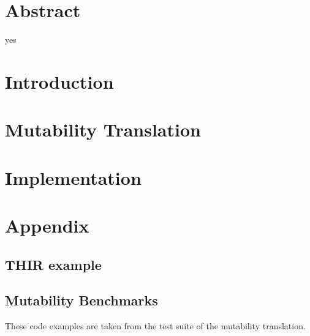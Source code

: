 \frontmatter
\chapter*{Abstract}
yes


\tableofcontents

\mainmatter

\chapter{Introduction}


\chapter{Mutability Translation}
\label{translation}


\chapter{Implementation}
\label{implementation}



\appendix




\chapter{Appendix}

\section{THIR example}


\section{Mutability Benchmarks}

These code examples are taken from the test suite of the mutability translation.


